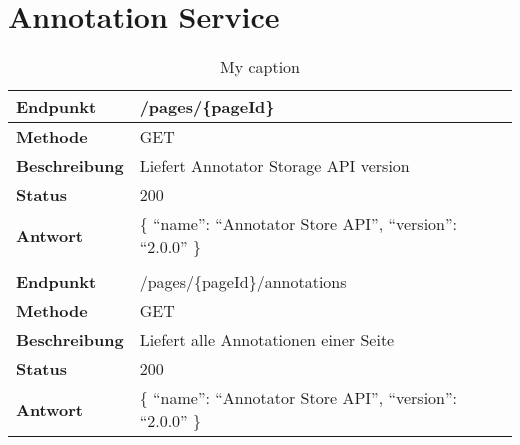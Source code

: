 \section{Annotation Service}
    \begin{table}[htb]
        \centering
        \begin{tabular}{|l|l|}
        \hline
        \textbf{Endpunkt}     & /pages/\{pageId\}\\
        \hline
        \textbf{Methode}      & GET\\
        \hline
        \textbf{Beschreibung} & Liefert Annotator Storage API version\\
        \hline
        \textbf{Status}       & 200\\
        \hline
        \textbf{Antwort}      & \{ ``name'': ``Annotator Store API'', ``version'': ``2.0.0'' \}\\
        \hline
        & \\
        \hline
        \textbf{Endpunkt}     & /pages/\{pageId\}/annotations\\
        \hline
        \textbf{Methode}      & GET\\
        \hline
        \textbf{Beschreibung} & Liefert alle Annotationen einer Seite\\
        \hline
        \textbf{Status}       & 200\\
        \hline
        \textbf{Antwort}      & \{ ``name'': ``Annotator Store API'', ``version'': ``2.0.0'' \}\\
        \hline
        \end{tabular}
        \caption{My caption}
        \label{my-label}
    \end{table}
